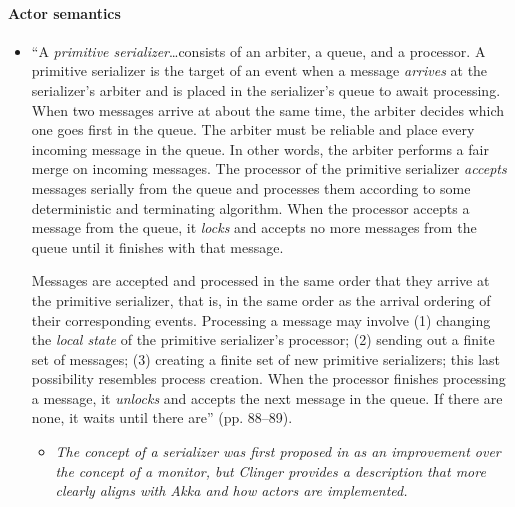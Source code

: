\paragraph{Actor semantics}
\begin{itemize}
\item ``A \emph{primitive serializer}{\ldots}consists of an arbiter, a queue, and a processor. A primitive serializer is the target of an event when a message \emph{arrives} at the serializer's arbiter and is placed in the serializer's queue to await processing. When two messages arrive at about the same time, the arbiter decides which one goes first in the queue. The arbiter must be reliable and place every incoming message in the queue. In other words, the arbiter performs a fair merge on incoming messages. The processor of the primitive serializer \emph{accepts} messages serially from the queue and processes them according to some deterministic and terminating algorithm. When the processor accepts a message from the queue, it \emph{locks} and accepts no more messages from the queue until it finishes with that message.

Messages are accepted and processed in the same order that they arrive at the primitive serializer, that is, in the same order as the arrival ordering of their corresponding events. Processing a message may involve (1) changing the \emph{local state} of the primitive serializer's processor; (2) sending out a finite set of messages; (3) creating a finite set of new primitive serializers; this last possibility resembles process creation. When the processor finishes processing a message, it \emph{unlocks} and accepts the next message in the queue. If there are none, it waits until there are'' (pp. 88--89).
	\begin{itemize}
	\item \emph{The concept of a serializer was first proposed in \cite{Atkinson1977} as an improvement over the concept of a monitor, but Clinger provides a description that more clearly aligns with Akka and how actors are implemented.}
	\end{itemize}
\end{itemize}

